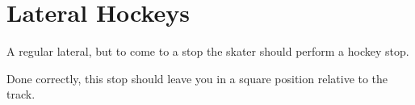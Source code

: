 \section{Lateral Hockeys}
\label{sec:laterals/hockey}

A regular lateral, but to come to a stop the skater should perform a hockey stop.  

Done correctly, this stop should leave you in a square position relative to the track.  
